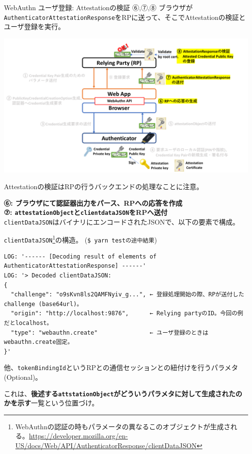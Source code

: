 \documentclass[12pt,dvipdfmx,uplatex]{beamer}
\begin{document}
\begin{frame}{WebAuthn ユーザ登録: Attestationの検証}
⑥,⑦,⑧ ブラウザが\texttt{AuthenticatorAttestationResponse}をRPに送って、そこでAttestationの検証とユーザ登録を実行。
\begin{center}
\includegraphics[width=0.9\linewidth]{Figs/webauthn-registration4.pdf}
\end{center}
\alert{Attestationの検証はRPの行うバックエンドの処理なことに注意。}
\end{frame}

\begin{frame}[fragile]
\textbf{⑥: ブラウザにて認証器出力をパース、RPへの応答を作成}\\
\textbf{⑦: \texttt{attestationObject}と\texttt{clientdataJSON}をRPへ送付}\\[2ex]

\texttt{clientDataJSON}はバイナリにエンコードされたJSONで、以下の要素で構成。
\begin{exampleblock}{\footnotesize \texttt{clientDataJSON}\footnote[frame]{\tiny WebAuthnの認証の時もパラメータの異なるこのオブジェクトが生成される。\url{https://developer.mozilla.org/en-US/docs/Web/API/AuthenticatorResponse/clientDataJSON}}の構造。 (\texttt{\$ yarn testの途中結果})}
\tiny
\begin{verbatim}
LOG: '------ [Decoding result of elements of AuthenticatorAttestationResponse] ------'
LOG: '> Decoded clientDataJSON:
{
  "challenge": "o9sKvn8ls2QAMFNyiv_g...", ← 登録処理開始の際、RPが送付したchallenge (base64url)。
  "origin": "http://localhost:9876",      ← Relying partyのID。今回の例だとlocalhost。
  "type": "webauthn.create"               ← ユーザ登録のときはwebauthn.create固定。
}'
\end{verbatim}
他、\texttt{tokenBindingId}というRPとの通信セッションとの紐付けを行うパラメタ (Optional)。
\end{exampleblock}
これは、\textbf{後述する\texttt{attstationObject}がどういうパラメタに対して生成されたのかを示す}一覧という位置づけ。
\end{frame}
\end{document}
